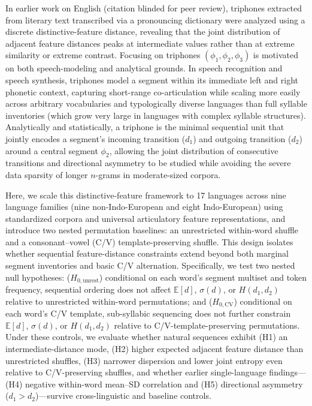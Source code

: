 \documentclass{interact}
\begin{document}
In earlier work on English (citation blinded for peer review), triphones extracted from literary text transcribed via a pronouncing dictionary were analyzed using a discrete distinctive-feature distance, revealing that the joint distribution of adjacent feature distances peaks at intermediate values rather than at extreme similarity or extreme contrast. Focusing on triphones $(\phi_1, \phi_2, \phi_3)$ is motivated on both speech-modeling and analytical grounds. In speech recognition and speech synthesis, triphones model a segment within its immediate left and right phonetic context, capturing short-range co-articulation while scaling more easily across arbitrary vocabularies and typologically diverse languages than full syllable inventories (which grow very large in languages with complex syllable structures). Analytically and statistically, a triphone is the minimal sequential unit that jointly encodes a segment's incoming transition ($d_1$) and outgoing transition ($d_2$) around a central segment $\phi_2$, allowing the joint distribution of consecutive transitions and directional asymmetry to be studied while avoiding the severe data sparsity of longer $n$-grams in moderate-sized corpora.

Here, we scale this distinctive-feature framework to 17 languages across nine language families (nine non-Indo-European and eight Indo-European) using standardized corpora and universal articulatory feature representations, and introduce two nested permutation baselines: an unrestricted within-word shuffle and a consonant--vowel (C/V) template-preserving shuffle. This design isolates whether sequential feature-distance constraints extend beyond both marginal segment inventories and basic C/V alternation. Specifically, we test two nested null hypotheses: ($H_{0,\text{unrest}}$) conditional on each word's segment multiset and token frequency, sequential ordering does not affect $\mathbb{E}[d]$, $\sigma(d)$, or $H(d_1, d_2)$ relative to unrestricted within-word permutations; and ($H_{0,\text{CV}}$) conditional on each word's C/V template, sub-syllabic sequencing does not further constrain $\mathbb{E}[d]$, $\sigma(d)$, or $H(d_1, d_2)$ relative to C/V-template-preserving permutations. Under these controls, we evaluate whether natural sequences exhibit (H1) an intermediate-distance mode, (H2) higher expected adjacent feature distance than unrestricted shuffles, (H3) narrower dispersion and lower joint entropy even relative to C/V-preserving shuffles, and whether earlier single-language findings---(H4) negative within-word mean--SD correlation and (H5) directional asymmetry ($d_1 > d_2$)---survive cross-linguistic and baseline controls.
\end{document}
